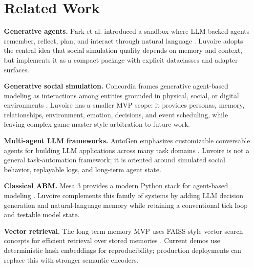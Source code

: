 \section{Related Work}

\textbf{Generative agents.} Park et al. introduced a sandbox where LLM-backed agents remember, reflect, plan, and interact through natural language \cite{park2023generative}. Luvoire adopts the central idea that social simulation quality depends on memory and context, but implements it as a compact package with explicit dataclasses and adapter surfaces.

\textbf{Generative social simulation.} Concordia frames generative agent-based modeling as interactions among entities grounded in physical, social, or digital environments \cite{vezhnevets2023concordia}. Luvoire has a smaller MVP scope: it provides personas, memory, relationships, environment, emotion, decisions, and event scheduling, while leaving complex game-master style arbitration to future work.

\textbf{Multi-agent LLM frameworks.} AutoGen emphasizes customizable conversable agents for building LLM applications across many task domains \cite{wu2023autogen}. Luvoire is not a general task-automation framework; it is oriented around simulated social behavior, replayable logs, and long-term agent state.

\textbf{Classical ABM.} Mesa 3 provides a modern Python stack for agent-based modeling \cite{terhoeven2025mesa}. Luvoire complements this family of systems by adding LLM decision generation and natural-language memory while retaining a conventional tick loop and testable model state.

\textbf{Vector retrieval.} The long-term memory MVP uses FAISS-style vector search concepts for efficient retrieval over stored memories \cite{johnson2017faiss}. Current demos use deterministic hash embeddings for reproducibility; production deployments can replace this with stronger semantic encoders.
